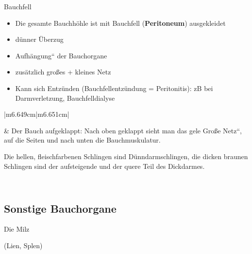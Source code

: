 \documentclass{article}
\newcommand\gT[1]{\textbf{\textup{\textcolor[rgb]{0.0,0.5019608,0.0}{#1}}}}
\newcommand\gZ[1]{\textcolor[rgb]{0.5019608,0.5019608,0.5019608}{#1}}
\begin{document}
{\mdseries\color[rgb]{0.0,0.0,0.5019608}
Bauchfell}

\begin{itemize}
\item {\mdseries
Die gesamte Bauchh\"ohle ist mit  Bauchfell
(\gT{Peritoneum}) ausgekleidet}

\item {\mdseries
d\"unner \"Uberzug}

\item {\mdseries
{\quotedblbase}Aufh\"angung{\textquotedblleft} der Bauchorgane }

\item {\mdseries
zus\"atzlich gro{\ss}es + kleines Netz}

\item {\mdseries
Kann sich Entz\"unden (Bauchfellentz\"undung = Peritonitis): zB bei
Darmverletzung, Bauchfelldialyse }

\end{itemize}
\begin{center}
\tablehead{}\begin{supertabular}{|m{6.649cm}|m{6.651cm}|}
\hline
{%
 \par}

 &
{\mdseries Der Bauch {\quotedblbase}aufgeklappt: Nach oben geklappt
sieht man das gele {\quotedblbase}Gro{\ss}e Netz{\textquotedblleft},
auf die Seiten und nach unten die Bauchmuskulatur. }

{\mdseries Die hellen, fleischfarbenen Schlingen sind
D\"unndarmschlingen, die dicken braunen Schlingen sind der aufsteigende
und der quere Teil des Dickdarmes.}

\\\hline
\end{supertabular}
\end{center}
\subsection{Sonstige Bauchorgane}
{\mdseries\color[rgb]{0.0,0.0,0.5019608}
Die Milz }

{\mdseries
\gZ{(Lien, Splen)}}
\end{document}
